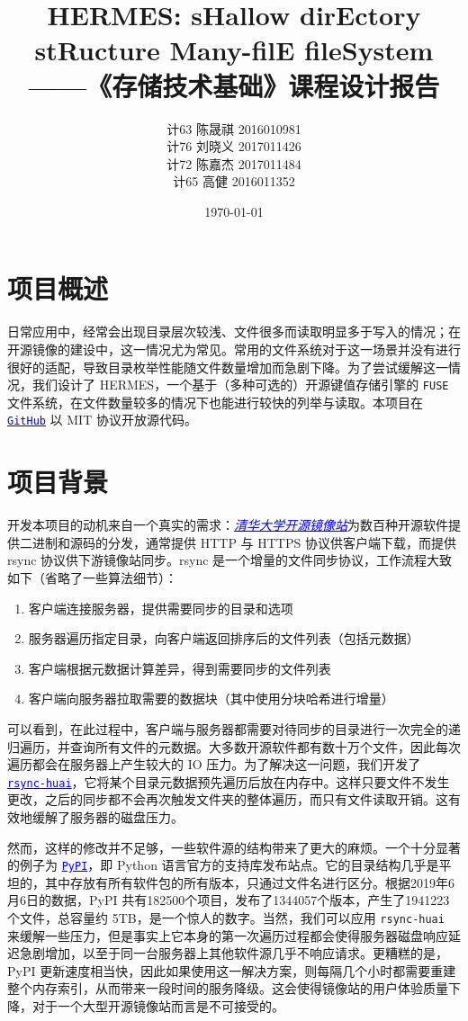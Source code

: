 \documentclass{ctexart}
\title{\Large \textbf{HERMES}: s\textbf{H}allow dir\textbf{E}ctory st\textbf{R}ucture \textbf{M}any-fil\textbf{E} file\textbf{S}ystem \\ ——《存储技术基础》课程设计报告}
\author{计63\,\,陈晟祺\,\,2016010981 \\
计76\,\,刘晓义\,\,2017011426 \\
计72\,\,陈嘉杰\,\,2017011484 \\
计65\,\,高\hspace{1em}健\,\,2016011352}
\date{\today{}}
\begin{document}
\maketitle

\section{项目概述}

日常应用中，经常会出现目录层次较浅、文件很多而读取明显多于写入的情况；在开源镜像的建设中，这一情况尤为常见。常用的文件系统对于这一场景并没有进行很好的适配，导致目录枚举性能随文件数量增加而急剧下降。为了尝试缓解这一情况，我们设计了 HERMES，一个基于（多种可选的）开源键值存储引擎的 \texttt{FUSE} 文件系统，在文件数量较多的情况下也能进行较快的列举与读取。本项目在 \href{https://github.com/Harry-Chen/HERMES}{\textcolor{blue}{\texttt{GitHub}}} 以 MIT 协议开放源代码。

\section{项目背景}

开发本项目的动机来自一个真实的需求：\href{https://mirrors.tuna.tsinghua.edu.cn}{\textcolor{blue}{\emph{清华大学开源镜像站}}}为数百种开源软件提供二进制和源码的分发，通常提供 HTTP 与 HTTPS 协议供客户端下载，而提供 rsync 协议供下游镜像站同步。rsync 是一个增量的文件同步协议，工作流程大致如下（省略了一些算法细节）：

\begin{enumerate}
    \item 客户端连接服务器，提供需要同步的目录和选项
    \item 服务器遍历指定目录，向客户端返回排序后的文件列表（包括元数据）
    \item 客户端根据元数据计算差异，得到需要同步的文件列表
    \item 客户端向服务器拉取需要的数据块（其中使用分块哈希进行增量）
\end{enumerate}

可以看到，在此过程中，客户端与服务器都需要对待同步的目录进行一次完全的递归遍历，并查询所有文件的元数据。大多数开源软件都有数十万个文件，因此每次遍历都会在服务器上产生较大的 IO 压力。为了解决这一问题，我们开发了 \href{https://github.com/tuna/rsync}{\textcolor{blue}{\texttt{rsync-huai}}}，它将某个目录元数据预先遍历后放在内存中。这样只要文件不发生更改，之后的同步都不会再次触发文件夹的整体遍历，而只有文件读取开销。这有效地缓解了服务器的磁盘压力。

然而，这样的修改并不足够，一些软件源的结构带来了更大的麻烦。一个十分显著的例子为 \href{https://pypi.org/}{\textcolor{blue}{\texttt{PyPI}}}，即 Python 语言官方的支持库发布站点。它的目录结构几乎是平坦的，其中存放有所有软件包的所有版本，只通过文件名进行区分。根据2019年6月6日的数据，PyPI 共有182500个项目，发布了1344057个版本，产生了1941223个文件，总容量约 5TB，是一个惊人的数字。当然，我们可以应用 \texttt{rsync-huai} 来缓解一些压力，但是事实上它本身的第一次遍历过程都会使得服务器磁盘响应延迟急剧增加，以至于同一台服务器上其他软件源几乎不响应请求。更糟糕的是，PyPI 更新速度相当快，因此如果使用这一解决方案，则每隔几个小时都需要重建整个内存索引，从而带来一段时间的服务降级。这会使得镜像站的用户体验质量下降，对于一个大型开源镜像站而言是不可接受的。
\end{document}
